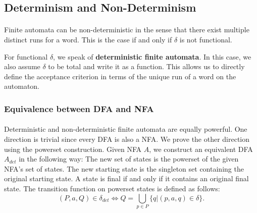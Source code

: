 \documentclass[11pt,a4paper,oneside]{book}
\begin{document}
            \subsection{Determinism and Non-Determinism}
                \paragraph{} 
                Finite automata can be non-deterministic in the sense that there exist multiple distinct runs for a word. This is the case if and only if $\delta$ is not functional. 



                For functional $\delta$, we speak of \textbf{deterministic finite automata}. In this case, we also assume $\delta$ to be total and write it as a function. 
                This allows us to directly define the acceptance criterion in terms of the unique run of a word on the automaton. 


                \subsubsection{Equivalence between DFA and NFA}
                    \paragraph{} 
                        Deterministic and non-deterministic finite automata are equally powerful. 
                        One direction is trivial since every DFA is also a NFA. 
                        We prove the other direction using the powerset construction. 
                        Given NFA $A$, we construct an equivalent DFA $A_{det}$ in the following way:
                        The new set of states is the powerset of the given NFA's set of states. 
                        The new starting state is the singleton set containing the original starting state. 
                        A state is final if and only if it contains an original final state. 
                        The transition function on powerset states is defined as follows:
                        \[
                            (P, a, Q) \in \delta_{det} \Longleftrightarrow Q = \bigcup \limits _{p \in P} \{ q | (p,a,q) \in \delta \}.
                        \]
\end{document}
